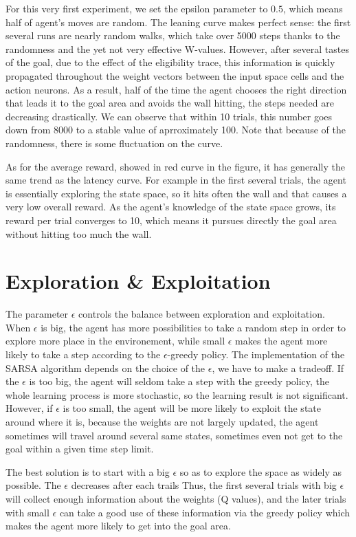 \documentclass[a4paper, 12pt]{article}
\begin{document}
For this very first experiment, we set the epsilon parameter to $0.5$,
which means half of agent's moves are random. The leaning curve makes
perfect sense: the first several runs are nearly random walks, which
take over 5000 steps thanks to the randomness and the yet not very
effective W-values. However, after several tastes of the goal, due to
the effect of the eligibility trace, this information is quickly
propagated throughout the weight vectors between the input space cells
and the action neurons. As a result, half of the time the agent
chooses the right direction that leads it to the goal area and avoids
the wall hitting, the steps needed are decreasing drastically. We can
observe that within 10 trials, this number goes down from 8000 to
a stable value of aprroximately 100. Note that because of the
randomness, there is some fluctuation on the curve.

As for the average reward, showed in red curve in the figure, it has
generally the same trend as the latency curve. For example in the
first several trials, the agent is essentially exploring the state
space, so it hits often the wall and that causes a very low overall
reward. As the agent's knowledge of the state space grows, its reward
per trial converges to 10, which means it pursues directly the goal
area without hitting too much the wall.

\section{Exploration \& Exploitation}
The parameter $\epsilon$ controls the balance between exploration and exploitation. When $\epsilon$ is big, the agent has more possibilities to take a random step in order to explore more place in the environement, while small $\epsilon$ makes the agent more likely to take a step according to the $\epsilon$-greedy policy. The implementation of the SARSA algorithm depends on the choice of the $\epsilon$, we have to make a tradeoff. If the $\epsilon$ is too big, the agent will seldom take a step with the greedy policy, the whole learning process is more stochastic, so the learning result is not significant. However, if $\epsilon$ is too small, the agent will be more likely to exploit the state around where it is, because the weights are not largely updated, the agent sometimes will travel around several same states, sometimes even not get to the goal within a given time step limit.

The best solution is to start with a big $\epsilon$ so as to explore the space as widely as possible. The $\epsilon$ decreases after each trails Thus, the first several trials with big $\epsilon$ will collect enough information about the weights (Q values), and the later trials with small $\epsilon$ can take a good use of these information via the greedy policy which makes the agent more likely to get into the goal area.
\end{document}
